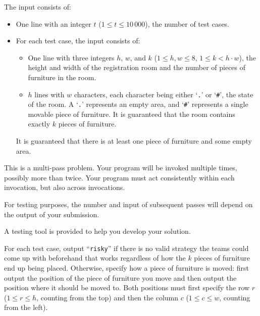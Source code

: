 \begin{Input}
    The input consists of:
    \begin{itemize}
        \item One line with an integer $t$ ($1\leq t\leq 10\,000$), the number of test cases.
        \item For each test case, the input consists of:
        \begin{itemize}
        	\item One line with three integers $h$, $w$, and $k$ ($1\leq h,w\leq 8$, $1 \leq k < h \cdot w$),
                the height and width of the registration room and the number of pieces of furniture in the room.
            \item $h$ lines with $w$ characters, each character being either `\texttt{.}' or `\texttt{\#}', the state of the room.
                A `\texttt{.}' represents an empty area, and `\texttt{\#}'
                represents a single movable piece of furniture.
                It is guaranteed that the room
                contains exactly $k$ pieces of furniture.
        \end{itemize}
        It is guaranteed that there is at least one piece of furniture and some empty area.
    \end{itemize}
    This is a multi-pass problem. Your program will be invoked multiple times,
    possibly more than twice.
    Your program must act consistently within each invocation, but also across
    invocations.

    For testing purposes, the number and input of subsequent passes will depend
    on the output of your submission.

    A testing tool is provided to help you develop your solution.
\end{Input}

\begin{Output}
    For each test case, output ``\texttt{risky}'' if there is no valid strategy the teams could come up with
    beforehand that works regardless of how the $k$ pieces of
    furniture end up being placed.
    Otherwise, specify how a piece of furniture is moved:
    first output the position of the piece of furniture you move and then output the position where it should be moved to.
    Both positions must first specify the row $r$ ($1\leq r \leq h$, counting
    from the top) and then
    the column $c$ ($1\leq c\leq w$, counting from the left).
\end{Output}
